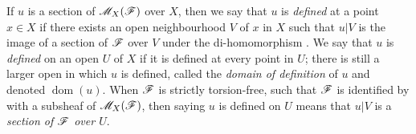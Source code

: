 \begin{env}[20.1.7]
\label{IV.20.1.7}
If $u$ is a section of $\mathscr{M}_X(\mathscr{F})$ over $X$, then we say that $u$ is \emph{defined} at a point $x\in X$ if there exists an open neighbourhood $V$ of $x$ in $X$ such that $u|V$ is the image of a section of $\mathscr{F}$ over $V$ under the di-homomorphism .
We say that $u$ is \emph{defined} on an open $U$ of $X$ if it is defined at every point in $U$;
there is still a larger open in which $u$ is defined, called the \emph{domain of definition} of $u$ and denoted $\operatorname{dom}(u)$.
When $\mathscr{F}$ is strictly torsion-free, such that $\mathscr{F}$ is identified by  with a subsheaf of $\mathscr{M}_X(\mathscr{F})$, then saying $u$ is defined on $U$ means that $u|V$ is a \emph{section of $\mathscr{F}$ over $U$}.
\end{env}

